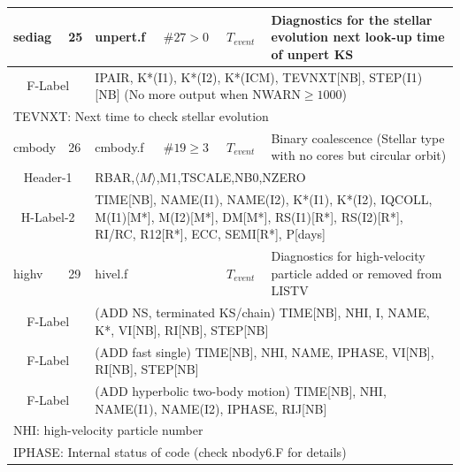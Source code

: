 \begin{longtable}{||p{0.42in}|p{0.25in}|p{0.6in}|p{0.6in}|p{0.4in}|p{2.3in}||}
  sediag     & 25  & unpert.f   & $\#27>0$   & $T_{event}$    & Diagnostics for the stellar evolution next look-up time of unpert KS \\\hline
\multicolumn{2}{|c|}{ F-Label } & \multicolumn{4}{|p{4.4in}|}{ IPAIR, K*(I1), K*(I2), K*(ICM), TEVNXT[NB], STEP(I1)[NB] (No more output when NWARN$\geq1000$)}\\\hline
\multicolumn{6}{|p{5.4in}|}{ TEVNXT: Next time to check stellar evolution }\\\hline\hline

   cmbody  & 26  & cmbody.f    & $\#19\geq3$   & $T_{event}$    & Binary coalescence (Stellar type with no cores but circular orbit) \\\hline
\multicolumn{2}{|c|}{ Header-1 } & \multicolumn{4}{|p{4.4in}|}{RBAR,$\langle M\rangle$,M1,TSCALE,NB0,NZERO}\\\hline \multicolumn{2}{|c|}{ H-Label-2 } & \multicolumn{4}{|p{4.4in}|}{TIME[NB], NAME(I1), NAME(I2), K*(I1), K*(I2), IQCOLL, M(I1)[M*], M(I2)[M*], DM[M*], RS(I1)[R*], RS(I2)[R*], RI/RC, R12[R*], ECC, SEMI[R*], P[days]}\\\hline
\hline\hline

  highv     & 29  & hivel.f    &         & $T_{event}$    & Diagnostics for high-velocity particle added or removed from LISTV %
\\\hline
\multicolumn{2}{|c|}{ F-Label } & \multicolumn{4}{|p{4.4in}|}{ (ADD NS, terminated KS/chain) TIME[NB], NHI, I, NAME, K*, VI[NB], RI[NB], STEP[NB] }\\\hline
\multicolumn{2}{|c|}{ F-Label } & \multicolumn{4}{|p{4.4in}|}{ (ADD fast single) TIME[NB], NHI, NAME, IPHASE, VI[NB], RI[NB], STEP[NB] }\\\hline
\multicolumn{2}{|c|}{ F-Label } & \multicolumn{4}{|p{4.4in}|}{ (ADD hyperbolic two-body motion) TIME[NB], NHI, NAME(I1), NAME(I2), IPHASE, RIJ[NB] }\\\hline
\multicolumn{6}{|p{5.4in}|}{ NHI: high-velocity particle number}\\
\multicolumn{6}{|p{5.4in}|}{ IPHASE: Internal status of code (check nbody6.F for details)}\\
\hline\hline


\end{longtable}
